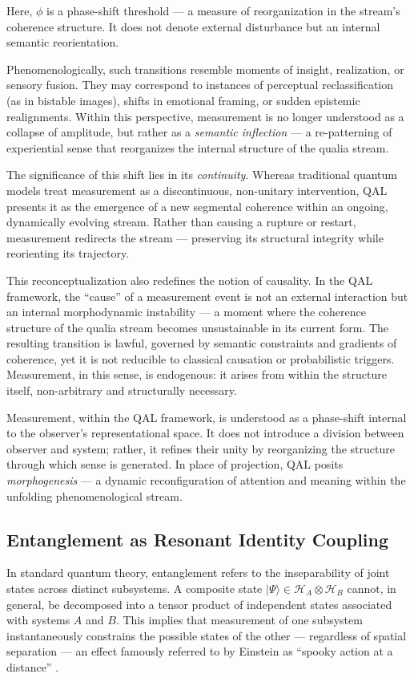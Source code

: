 \documentclass[11pt]{article}
\numberwithin{equation}{section} %
\begin{document}
Here, \( \phi \) is a phase-shift threshold — a measure of reorganization in the stream’s coherence structure. It does not denote external disturbance but an internal semantic reorientation.

Phenomenologically, such transitions resemble moments of insight, realization, or sensory fusion. They may correspond to instances of perceptual reclassification (as in bistable images), shifts in emotional framing, or sudden epistemic realignments. Within this perspective, measurement is no longer understood as a collapse of amplitude, but rather as a \textit{semantic inflection} — a re-patterning of experiential sense that reorganizes the internal structure of the qualia stream.

The significance of this shift lies in its \textit{continuity}. Whereas traditional quantum models treat measurement as a discontinuous, non-unitary intervention, QAL presents it as the emergence of a new segmental coherence within an ongoing, dynamically evolving stream. Rather than causing a rupture or restart, measurement redirects the stream — preserving its structural integrity while reorienting its trajectory.

This reconceptualization also redefines the notion of causality. In the QAL framework, the “cause” of a measurement event is not an external interaction but an internal morphodynamic instability — a moment where the coherence structure of the qualia stream becomes unsustainable in its current form. The resulting transition is lawful, governed by semantic constraints and gradients of coherence, yet it is not reducible to classical causation or probabilistic triggers. Measurement, in this sense, is endogenous: it arises from within the structure itself, non-arbitrary and structurally necessary.

Measurement, within the QAL framework, is understood as a phase-shift internal to the observer’s representational space. It does not introduce a division between observer and system; rather, it refines their unity by reorganizing the structure through which sense is generated. In place of projection, QAL posits \textit{morphogenesis} — a dynamic reconfiguration of attention and meaning within the unfolding phenomenological stream.

\subsection{Entanglement as Resonant Identity Coupling}

In standard quantum theory, entanglement refers to the inseparability of joint states across distinct subsystems. A composite state \( |\Psi\rangle \in \mathcal{H}_A \otimes \mathcal{H}_B \) cannot, in general, be decomposed into a tensor product of independent states associated with systems \( A \) and \( B \). This implies that measurement of one subsystem instantaneously constrains the possible states of the other — regardless of spatial separation — an effect famously referred to by Einstein as “spooky action at a distance” \cite{einstein1935}.
\end{document}
